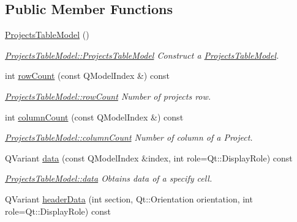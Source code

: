 \subsection*{Public Member Functions}
\begin{DoxyCompactItemize}
\item 
\hyperlink{classGui_1_1Widgets_1_1WdgModels_1_1ProjectsTableModel_a4e0841b0ef99ec466d9660c39528925a}{Projects\-Table\-Model} ()
\begin{DoxyCompactList}\small\item\em \hyperlink{classGui_1_1Widgets_1_1WdgModels_1_1ProjectsTableModel_a4e0841b0ef99ec466d9660c39528925a}{Projects\-Table\-Model\-::\-Projects\-Table\-Model} Construct a \hyperlink{classGui_1_1Widgets_1_1WdgModels_1_1ProjectsTableModel}{Projects\-Table\-Model}. \end{DoxyCompactList}\item 
int \hyperlink{classGui_1_1Widgets_1_1WdgModels_1_1ProjectsTableModel_aeb603c6cedf81682234f705c4e51c4d5}{row\-Count} (const Q\-Model\-Index \&) const 
\begin{DoxyCompactList}\small\item\em \hyperlink{classGui_1_1Widgets_1_1WdgModels_1_1ProjectsTableModel_aeb603c6cedf81682234f705c4e51c4d5}{Projects\-Table\-Model\-::row\-Count} Number of projects row. \end{DoxyCompactList}\item 
int \hyperlink{classGui_1_1Widgets_1_1WdgModels_1_1ProjectsTableModel_a02d2308cf2a4894d57b12e4ab3886c29}{column\-Count} (const Q\-Model\-Index \&) const 
\begin{DoxyCompactList}\small\item\em \hyperlink{classGui_1_1Widgets_1_1WdgModels_1_1ProjectsTableModel_a02d2308cf2a4894d57b12e4ab3886c29}{Projects\-Table\-Model\-::column\-Count} Number of column of a Project. \end{DoxyCompactList}\item 
Q\-Variant \hyperlink{classGui_1_1Widgets_1_1WdgModels_1_1ProjectsTableModel_aca598260b807060a5d89f09430d6bd1d}{data} (const Q\-Model\-Index \&index, int role=Qt\-::\-Display\-Role) const 
\begin{DoxyCompactList}\small\item\em \hyperlink{classGui_1_1Widgets_1_1WdgModels_1_1ProjectsTableModel_aca598260b807060a5d89f09430d6bd1d}{Projects\-Table\-Model\-::data} Obtains data of a specify cell. \end{DoxyCompactList}\item 
Q\-Variant \hyperlink{classGui_1_1Widgets_1_1WdgModels_1_1ProjectsTableModel_ad984702eada2770507a1507ea9e3e685}{header\-Data} (int section, Qt\-::\-Orientation orientation, int role=Qt\-::\-Display\-Role) const 

\end{DoxyCompactItemize}
